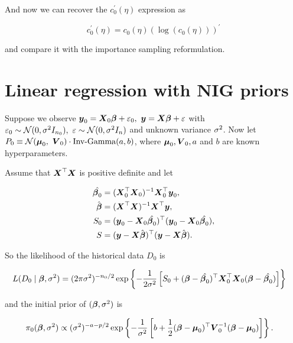     And now we can recover the $c_0^\prime(\eta)$ expression as

    \begin{equation}
        \label{eq:recover-c0p}
        c_0^\prime(\eta) = c_0(\eta)(\log(c_0(\eta)))^\prime
    \end{equation}

    and compare it with the importance sampling reformulation.

\section{Linear regression with NIG priors}

    \label{example:nig_lm}
    Suppose we observe $\boldsymbol{y}_{0} = \boldsymbol{X}_0 \boldsymbol{\beta} + \varepsilon_0, \ \boldsymbol{y} = \boldsymbol{X} \boldsymbol{\beta} + \varepsilon$ with $\varepsilon_0 \sim \mathcal{N}(0, \sigma^2 I_{n_0}), \ \varepsilon \sim \mathcal{N}(0, \sigma^2 I_{n})$ and unknown variance $\sigma^2$. Now let $P_0 \equiv \mathcal{N}(\boldsymbol{\mu}_0, \ \boldsymbol{V}_0) \cdot \operatorname{Inv-Gamma}(a,b)$, where $\boldsymbol{\mu}_0, \boldsymbol{V}_0, a$ and $b$ are known hyperparameters. 
    
    Assume that $\boldsymbol{X}^\top \boldsymbol{X}$ is positive definite and let 

    \begin{align*}
        \hat{\boldsymbol{\beta}_0} &= (\boldsymbol{X}_0^\top \boldsymbol{X}_0)^{-1} \boldsymbol{X}_0^\top \boldsymbol{y}_0,
        \\
        \hat{\boldsymbol{\beta}} &= (\boldsymbol{X}^\top \boldsymbol{X})^{-1} \boldsymbol{X}^\top \boldsymbol{y},
        \\
        S_0 &= (\boldsymbol{y}_0 - \boldsymbol{X}_0 \hat{\boldsymbol{\beta}_0})^\top (\boldsymbol{y}_0 - \boldsymbol{X}_0 \hat{\boldsymbol{\beta}_0}),
        \\
        S &= (\boldsymbol{y} - \boldsymbol{X} \hat{\boldsymbol{\beta}})^\top (\boldsymbol{y} - \boldsymbol{X} \hat{\boldsymbol{\beta}}).
    \end{align*}

    So the likelihood of the historical data $D_0$ is

    \begin{align*}
        L(D_0 \mid \boldsymbol{\beta}, \sigma^2) &= (2\pi\sigma^2)^{-n_0/2} \exp\left\{ -\frac{1}{2\sigma^2}\left[S_0 + (\boldsymbol{\beta} - \hat{\boldsymbol{\beta}_0})^\top \boldsymbol{X}_0^\top \boldsymbol{X}_0 (\boldsymbol{\beta} - \hat{\boldsymbol{\beta}_0})\right] \right\}
    \end{align*}

    and the initial prior of $(\boldsymbol{\beta}, \sigma^2)$ is

    \begin{align*}
        \pi_0(\boldsymbol{\beta}, \sigma^2) &\propto (\sigma^2)^{-a - p/2} \exp\left\{ -\frac{1}{\sigma^2} \left[ b + \frac{1}{2}(\boldsymbol{\beta} - \boldsymbol{\mu}_0)^\top \boldsymbol{V}_0^{-1} (\boldsymbol{\beta} - \boldsymbol{\mu}_0) \right] \right\}.
    \end{align*}

